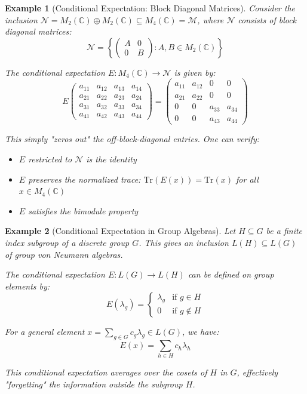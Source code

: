 \documentclass[11pt, a4paper]{article}
\theoremstyle{colored_def}
\theoremstyle{colored_thm}
\theoremstyle{colored_ex}
\newtheorem{example}{Example}[section]
\newcommand{\C}{\mathbb{C}}
\newcommand{\Tr}{\text{Tr}}
\newcommand{\M}{\mathcal{M}}
\newcommand{\N}{\mathcal{N}}
\begin{document}
\begin{example}[Conditional Expectation: Block Diagonal Matrices]\label{ex:cond-exp-block}
Consider the inclusion $\N = M_2(\C) \oplus M_2(\C) \subseteq M_4(\C) = \M$, where $\N$ consists of block diagonal matrices:
$$ \N = \left\{ \begin{pmatrix} A & 0 \\ 0 & B \end{pmatrix} : A, B \in M_2(\C) \right\} $$

The conditional expectation $E: M_4(\C) \to \N$ is given by:
$$ E\begin{pmatrix} a_{11} & a_{12} & a_{13} & a_{14} \\ a_{21} & a_{22} & a_{23} & a_{24} \\ a_{31} & a_{32} & a_{33} & a_{34} \\ a_{41} & a_{42} & a_{43} & a_{44} \end{pmatrix} = \begin{pmatrix} a_{11} & a_{12} & 0 & 0 \\ a_{21} & a_{22} & 0 & 0 \\ 0 & 0 & a_{33} & a_{34} \\ 0 & 0 & a_{43} & a_{44} \end{pmatrix} $$

This simply "zeros out" the off-block-diagonal entries. One can verify:
\begin{itemize}
    \item $E$ restricted to $\N$ is the identity
    \item $E$ preserves the normalized trace: $\Tr(E(x)) = \Tr(x)$ for all $x \in M_4(\C)$
    \item $E$ satisfies the bimodule property
\end{itemize}
\end{example}

\begin{example}[Conditional Expectation in Group Algebras]\label{ex:cond-exp-group}
Let $H \subseteq G$ be a finite index subgroup of a discrete group $G$. This gives an inclusion $L(H) \subseteq L(G)$ of group von Neumann algebras.

The conditional expectation $E: L(G) \to L(H)$ can be defined on group elements by:
$$ E(\lambda_g) = \begin{cases} \lambda_g & \text{if } g \in H \\ 0 & \text{if } g \notin H \end{cases} $$

For a general element $x = \sum_{g \in G} c_g \lambda_g \in L(G)$, we have:
$$ E(x) = \sum_{h \in H} c_h \lambda_h $$

This conditional expectation averages over the cosets of $H$ in $G$, effectively "forgetting" the information outside the subgroup $H$.
\end{example}
\end{document}
